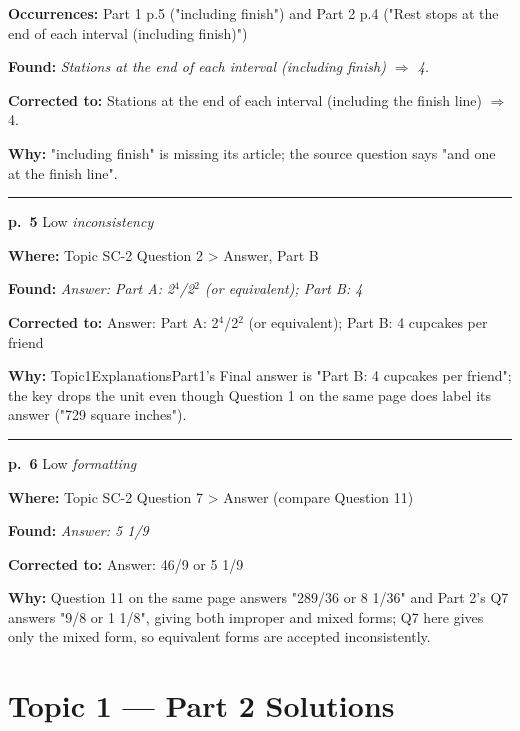 \documentclass[11pt]{article}
\newcommand{\sevlow}[1]{\textcolor{black!55}{#1}}
\begin{document}
\noindent\textbf{Occurrences: }Part 1 p.5 ("including finish") and Part 2 p.4 ("Rest stops at the end of each interval (including finish)")\par
\noindent\textbf{Found: }\textit{Stations at the end of each interval (including finish) $\Rightarrow$ 4.}\par
\noindent\textbf{Corrected to: }Stations at the end of each interval (including the finish line) $\Rightarrow$ 4.\par
\noindent\textbf{Why: }"including finish" is missing its article; the source question says "and one at the finish line".\par\vspace{4pt}
\noindent\rule{\textwidth}{0.4pt}\par\nobreak\vspace{2pt}
\noindent\textbf{p.~5} \quad \sevlow{Low} \quad \textit{inconsistency}\par
\noindent\textbf{Where: }Topic SC-2 Question 2 > Answer, Part B\par
\noindent\textbf{Found: }\textit{Answer: Part A: 2$^4$/2$^2$ (or equivalent); Part B: 4}\par
\noindent\textbf{Corrected to: }Answer: Part A: 2$^4$/2$^2$ (or equivalent); Part B: 4 cupcakes per friend\par
\noindent\textbf{Why: }Topic1ExplanationsPart1's Final answer is "Part B: 4 cupcakes per friend"; the key drops the unit even though Question 1 on the same page does label its answer ("729 square inches").\par\vspace{4pt}
\noindent\rule{\textwidth}{0.4pt}\par\nobreak\vspace{2pt}
\noindent\textbf{p.~6} \quad \sevlow{Low} \quad \textit{formatting}\par
\noindent\textbf{Where: }Topic SC-2 Question 7 > Answer (compare Question 11)\par
\noindent\textbf{Found: }\textit{Answer: 5 1/9}\par
\noindent\textbf{Corrected to: }Answer: 46/9 or 5 1/9\par
\noindent\textbf{Why: }Question 11 on the same page answers "289/36 or 8 1/36" and Part 2's Q7 answers "9/8 or 1 1/8", giving both improper and mixed forms; Q7 here gives only the mixed form, so equivalent forms are accepted inconsistently.\par\vspace{4pt}
\newpage\section*{Topic 1 --- Part 2 Solutions}
\end{document}

